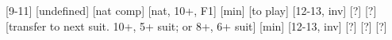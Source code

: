 \begin{bidsemi}
[9-11]
[undefined]
[nat comp]
[nat, 10+, F1]
    [min]
        [to play]
    [12-13, inv]
    [?]
    [?]
[transfer to next suit. 10+, 5+ suit; or 8+, 6+ suit]
    [min]
    [12-13, inv]
    [?]
    [?]
[?]
\end{bidsemi}